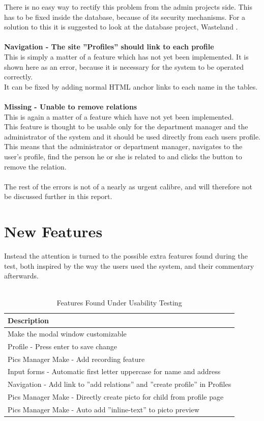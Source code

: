 There is no easy way to rectify this problem from the admin projects side. This has to be fixed inside the database, because of its security mechanisms. For a solution to this it is suggested to look at the database project, Wasteland \citep{wasteland}.\\
\\
\textbf{Navigation - The site ''Profiles'' should link to each profile}\\
This is simply a matter of a feature which has not yet been implemented. It is shown here as an error, because it is necessary for the system to be operated correctly.\\
It can be fixed by adding normal HTML anchor links to each name in the tables.\\
\\
\textbf{Missing - Unable to remove relations}\\
This is again a matter of a feature which have not yet been implemented.\\
This feature is thought to be usable only for the department manager and the administrator of the system and it should be used directly from each users profile. This means that the administrator or department manager, navigates to the user's profile, find the person he or she is related to and clicks the button to remove the relation.\\
\\
The rest of the errors is not of a nearly as urgent calibre, and will therefore not be discussed further in this report.\\

\section{New Features}
Instead the attention is turned to the possible extra features found during the test, both inspired by the way the users used the system, and their commentary afterwards.\\
\\

\begin{table}[htbp]
	\centering
		\begin{tabular}{|l|}
			\hline
			Description\\\hline\hline
			Make the modal window customizable \\\hline
			Profile - Press enter to save change \\\hline
			Pics Manager Make - Add recording feature\\\hline
			Input forms - Automatic first letter uppercase for name and address\\\hline  
			Navigation - Add link to ''add relations'' and ''create profile'' in Profiles \\\hline  
			Pics Manager Make - Directly create picto for child from profile page \\\hline
			Pics Manager Make - Auto add ''inline-text'' to picto preview \\\hline
		\end{tabular}
	\caption{Features Found Under Usability Testing}
	\label{tab:NewFeature}
\end{table}	

